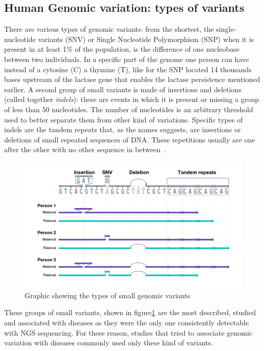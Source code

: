 \subsection{Human Genomic variation: types of variants}
There are various types of genomic variants: from the shortest, the single-nucleotide variants (SNV) or Single Nucleotide Polymorphism (SNP) when it is present in at least 1\% of the population, is the difference of one nucleobase between two individuals. In a specific part of the genome one person can have instead of a cytosine (C) a thymine (T), like for the SNP located 14 thousands bases upstream of the lactase gene that enables the lactase persistence mentioned earlier\cite{lactase_persistance}.
A second group of small variants is made of insertions and deletions (called together \emph{indels}): these are events in which it is present or missing a group of less than 50 nucleotides. The number of nucleotides is an arbitrary threshold used to better separate them from other kind of variations. Specific types of indels are the tandem repeats that, as the names suggests, are insertions or deletions of small repeated sequences of DNA. These repetitions usually are one after the other with no other sequence in between~\cite{nih_variation}.\\
\begin{figure}[!ht]
	\centering
	\includegraphics[width=\linewidth]{figures/background/small_variants.png}
	\caption[Small genomic variants.]{Graphic showing the types of small genomic variants~\cite{nih_variation}}
	\label{fig:small_variants}
\end{figure}
These groups of small variants, shown in figure\ref{fig:small_variants} are the most described, studied and associated with diseases as they were the only one consistently detectable with NGS sequencing. For these reason, studies that tried to associate genomic variation with diseases commonly used only these kind of variants.\\
